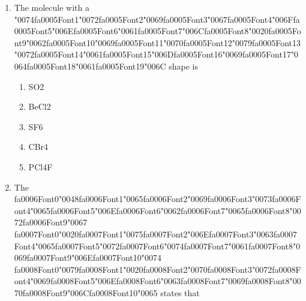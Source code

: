 \documentclass[12pt]{article}
\begin{document}
\begin{enumerate}[label=\arabic*.]
\begin{enumerate}[label=(\alph*)]
    \item It causes the pH to fluctuate unpredictably.
    \item It causes the pH to equalize with the water's pH.
    \item It causes the pH to become extremely basic.
    \item It neutralizes the pH completely.
    \item It significantly decreases the pH.
\end{enumerate}
\item The molecule with a {\char"0074}{\csname fa0005Font1\endcsname\char"0072}{\csname fa0005Font2\endcsname\char"0069}{\csname fa0005Font3\endcsname\char"0067}{\csname fa0005Font4\endcsname\char"006F}{\csname fa0005Font5\endcsname\char"006E}{\csname fa0005Font6\endcsname\char"0061}{\csname fa0005Font7\endcsname\char"006C}{\csname fa0005Font8\endcsname\char"0020}{\csname fa0005Font9\endcsname\char"0062}{\csname fa0005Font10\endcsname\char"0069}{\csname fa0005Font11\endcsname\char"0070}{\csname fa0005Font12\endcsname\char"0079}{\csname fa0005Font13\endcsname\char"0072}{\csname fa0005Font14\endcsname\char"0061}{\csname fa0005Font15\endcsname\char"006D}{\csname fa0005Font16\endcsname\char"0069}{\csname fa0005Font17\endcsname\char"0064}{\csname fa0005Font18\endcsname\char"0061}{\csname fa0005Font19\endcsname\char"006C} shape is
\begin{enumerate}[label=(\alph*)]
    \item SO2
    \item BeCl2
    \item SF6
    \item CBr4
    \item PCl4F
\end{enumerate}
\item The {\csname fa0006Font0\endcsname\char"0048}{\csname fa0006Font1\endcsname\char"0065}{\csname fa0006Font2\endcsname\char"0069}{\csname fa0006Font3\endcsname\char"0073}{\csname fa0006Font4\endcsname\char"0065}{\csname fa0006Font5\endcsname\char"006E}{\csname fa0006Font6\endcsname\char"0062}{\csname fa0006Font7\endcsname\char"0065}{\csname fa0006Font8\endcsname\char"0072}{\csname fa0006Font9\endcsname\char"0067} {\csname fa0007Font0\endcsname\char"0020}{\csname fa0007Font1\endcsname\char"0075}{\csname fa0007Font2\endcsname\char"006E}{\csname fa0007Font3\endcsname\char"0063}{\csname fa0007Font4\endcsname\char"0065}{\csname fa0007Font5\endcsname\char"0072}{\csname fa0007Font6\endcsname\char"0074}{\csname fa0007Font7\endcsname\char"0061}{\csname fa0007Font8\endcsname\char"0069}{\csname fa0007Font9\endcsname\char"006E}{\csname fa0007Font10\endcsname\char"0074} {\csname fa0008Font0\endcsname\char"0079}{\csname fa0008Font1\endcsname\char"0020}{\csname fa0008Font2\endcsname\char"0070}{\csname fa0008Font3\endcsname\char"0072}{\csname fa0008Font4\endcsname\char"0069}{\csname fa0008Font5\endcsname\char"006E}{\csname fa0008Font6\endcsname\char"0063}{\csname fa0008Font7\endcsname\char"0069}{\csname fa0008Font8\endcsname\char"0070}{\csname fa0008Font9\endcsname\char"006C}{\csname fa0008Font10\endcsname\char"0065} states that

\end{enumerate}
\end{document}
